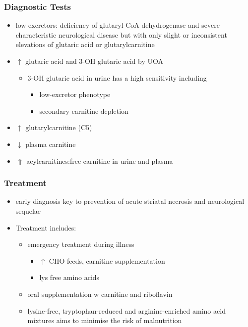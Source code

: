 \documentclass{scrartcl}
\begin{document}
\subsubsection{Diagnostic Tests}
\label{sec:orgf82c2ac}
\begin{itemize}
\item low excretors: deficiency of glutaryl-CoA dehydrogenase and severe
characteristic neurological disease but with only slight or
inconsistent elevations of glutaric acid or glutarylcarnitine
\item \(\uparrow\) glutaric acid and 3-OH glutaric acid by UOA
\begin{itemize}
\item 3-OH glutaric acid in urine has a high sensitivity including
\begin{itemize}
\item low-excretor phenotype
\item secondary carnitine depletion
\end{itemize}
\end{itemize}
\item \(\uparrow\) glutarylcarnitine (C5)
\item \(\downarrow\) plasma carnitine
\item \(\Uparrow\) acylcarnitines:free carnitine in urine and plasma
\end{itemize}

\subsubsection{Treatment}
\label{sec:org5ff03da}
\begin{itemize}
\item early diagnosis key to prevention of acute striatal necrosis and
neurological sequelae
\item Treatment includes:
\begin{itemize}
\item emergency treatment during illness
\begin{itemize}
\item \(\uparrow\) CHO feeds, carnitine supplementation
\item lys free amino acids
\end{itemize}
\item oral supplementation w carnitine and riboflavin
\item lysine-free, tryptophan-reduced and arginine-enriched amino acid
mixtures aims to minimise the risk of malnutrition
\end{itemize}
\end{itemize}
\end{document}
